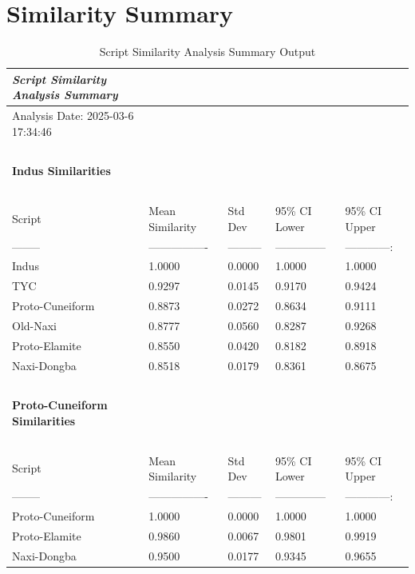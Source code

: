 \documentclass[11pt,a4paper,oneside]{report}
\begin{document}
\section{Similarity Summary}
\label{app: sim-sum}
\begin{table}[H]
    \caption{Script Similarity Analysis Summary Output}
    \centering
    \begin{tabular}{|l|l|l|l|l|}
    \hline
        \textit{Script Similarity Analysis Summary} & ~ & ~ & ~ & ~ \\ \hline
        Analysis Date: 2025-03-6 17:34:46 & ~ & ~ & ~ & ~ \\ \hline
        ~ & ~ & ~ & ~ & ~ \\ \hline
        \textbf{Indus Similarities} & ~ & ~ & ~ & ~ \\ \hline
        ~ & ~ & ~ & ~ & ~ \\ \hline
        Script & Mean Similarity & Std Dev & 95\% CI Lower & 95\% CI Upper \\ \hline
        -------- & ---------------- & --------- & -------------- & ------------: \\ \hline
        Indus & 1.0000 & 0.0000 & 1.0000 & 1.0000 \\ \hline
        TYC & 0.9297 & 0.0145 & 0.9170 & 0.9424 \\ \hline
        Proto-Cuneiform & 0.8873 & 0.0272 & 0.8634 & 0.9111 \\ \hline
        Old-Naxi & 0.8777 & 0.0560 & 0.8287 & 0.9268 \\ \hline
        Proto-Elamite & 0.8550 & 0.0420 & 0.8182 & 0.8918 \\ \hline
        Naxi-Dongba & 0.8518 & 0.0179 & 0.8361 & 0.8675 \\ \hline
        ~ & ~ & ~ & ~ & ~ \\ \hline
        \textbf{Proto-Cuneiform Similarities} & ~ & ~ & ~ & ~ \\ \hline
        ~ & ~ & ~ & ~ & ~ \\ \hline
        Script & Mean Similarity & Std Dev & 95\% CI Lower & 95\% CI Upper \\ \hline
        -------- & ---------------- & --------- & -------------- & ------------: \\ \hline
        Proto-Cuneiform & 1.0000 & 0.0000 & 1.0000 & 1.0000 \\ \hline
        Proto-Elamite & 0.9860 & 0.0067 & 0.9801 & 0.9919 \\ \hline
        Naxi-Dongba & 0.9500 & 0.0177 & 0.9345 & 0.9655 \\ \hline

\end{tabular}
\end{table}
\end{document}
